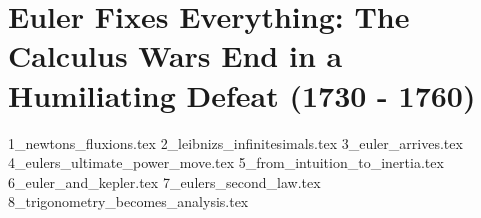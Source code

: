 \section{Euler Fixes Everything: The Calculus Wars End in a Humiliating Defeat (1730 - 1760)}  

{1_newtons_fluxions.tex}
{2_leibnizs_infinitesimals.tex}
{3_euler_arrives.tex}
{4_eulers_ultimate_power_move.tex}
{5_from_intuition_to_inertia.tex}
{6_euler_and_kepler.tex}
{7_eulers_second_law.tex}
{8_trigonometry_becomes_analysis.tex}

